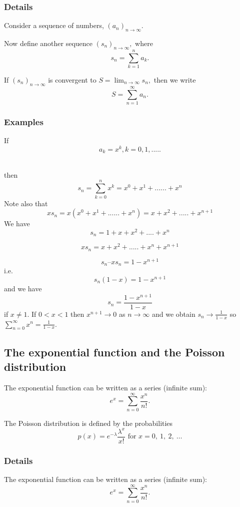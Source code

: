 \documentclass[12pt,a4paper]{article}
\theoremstyle{regla}
\theoremstyle{remark}
\theoremstyle{definition}
\theoremstyle{nonumberbreak}
\begin{document}
\subsubsection{Details}
Consider a sequence of numbers, $(a_n)_{n\to\infty}$. 

Now define another sequence $(s_n)_{n\to\infty},$ where 
$$s_n=\sum_{k=1}^na_k.$$

 
If $(s_n)_{n\to\infty}$ is convergent to $S=\lim_{n\to\infty}s_n,$ then we write 
$$S=\sum_{n=1}^{\infty}a_n.$$

 



\subsubsection{Examples}
\begin{xmpl}
If $$a_k = x^k, k=0,1,.....$$

\\ then 
$$s_n=\sum_{k=0}^{n}x^k=x^0+x^1+......+x^n$$
Note also that
$$xs_n=x(x^0+x^1+......+x^n)= x + x^2 + ..... + x^{n+1}$$
We have
$$s_n = 1 + x + x^2 + .... + x^n$$

$$xs_n = x + x^2 + ..... +x^n + x^{n+1}$$

$$s_n – xs_n = 1 - x^{n+1}$$
i.e.
$$s_n(1-x) = 1-x^{n+1}$$
and we have
	$$s_n =\frac{1-x^{n+1}}{1-x}$$
if $x\neq1$. 
If $0<x<1$ then $x^{n+1}\to 0$ as $n\to\infty$ and we obtain $s_n\to\frac{1}{1-x}$ so $\sum_{n=0}^{\infty}x^n=\frac{1}{1-x}$.
\end{xmpl}

\subsection{The exponential function and the Poisson distribution}
\begin{fbox}
\begin{minipage}{0.97\textwidth}
The exponential function can be written as a series (infinite sum):
$$e^x=\sum_{n=0}^{\infty}\frac{x^n}{n!}.$$

 

The Poisson distribution is defined by the probabilities 
$$p(x)=e^{-\lambda}\frac{\lambda^x}{x!}\textrm{ for } x=0,\ 1,\ 2,\ \ldots$$

 

\end{minipage}
\end{fbox}
\subsubsection{Details}
The exponential function can be written as a series (infinite sum):
$$e^x=\sum_{n=0}^{\infty}\frac{x^n}{n!}.$$
\end{document}
